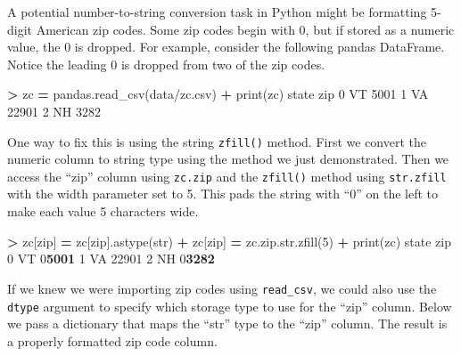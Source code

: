 \documentclass[
]{book}
\newenvironment{Shaded}{\begin{snugshade}}{\end{snugshade}}
\newcommand{\BuiltInTok}[1]{#1}
\newcommand{\DecValTok}[1]{\textcolor[rgb]{0.00,0.00,0.81}{#1}}
\newcommand{\ErrorTok}[1]{\textcolor[rgb]{0.64,0.00,0.00}{\textbf{#1}}}
\newcommand{\NormalTok}[1]{#1}
\newcommand{\OperatorTok}[1]{\textcolor[rgb]{0.81,0.36,0.00}{\textbf{#1}}}
\newcommand{\StringTok}[1]{\textcolor[rgb]{0.31,0.60,0.02}{#1}}
\begin{document}
A potential number-to-string conversion task in Python might be formatting 5-digit American zip codes. Some zip codes begin with 0, but if stored as a numeric value, the 0 is dropped. For example, consider the following pandas DataFrame. Notice the leading 0 is dropped from two of the zip codes.

\begin{Shaded}
\begin{Highlighting}[]
\OperatorTok{\textgreater{}}\NormalTok{ zc }\OperatorTok{=}\NormalTok{ pandas.read\_csv(}\StringTok{\textquotesingle{}data/zc.csv\textquotesingle{}}\NormalTok{)}
\OperatorTok{+} \BuiltInTok{print}\NormalTok{(zc)}
\NormalTok{  state    }\BuiltInTok{zip}
\DecValTok{0}\NormalTok{    VT   }\DecValTok{5001}
\DecValTok{1}\NormalTok{    VA  }\DecValTok{22901}
\DecValTok{2}\NormalTok{    NH   }\DecValTok{3282}
\end{Highlighting}
\end{Shaded}

One way to fix this is using the string \texttt{zfill()} method. First we convert the numeric column to string type using the method we just demonstrated. Then we access the ``zip'' column using \texttt{zc.zip} and the \texttt{zfill()} method using \texttt{str.zfill} with the width parameter set to 5. This pads the string with ``0'' on the left to make each value 5 characters wide.

\begin{Shaded}
\begin{Highlighting}[]
\OperatorTok{\textgreater{}}\NormalTok{ zc[}\StringTok{\textquotesingle{}zip\textquotesingle{}}\NormalTok{] }\OperatorTok{=}\NormalTok{ zc[}\StringTok{\textquotesingle{}zip\textquotesingle{}}\NormalTok{].astype(}\BuiltInTok{str}\NormalTok{)}
\OperatorTok{+}\NormalTok{ zc[}\StringTok{\textquotesingle{}zip\textquotesingle{}}\NormalTok{] }\OperatorTok{=}\NormalTok{ zc.}\BuiltInTok{zip}\NormalTok{.}\BuiltInTok{str}\NormalTok{.zfill(}\DecValTok{5}\NormalTok{)}
\OperatorTok{+} \BuiltInTok{print}\NormalTok{(zc)}
\NormalTok{  state    }\BuiltInTok{zip}
\DecValTok{0}\NormalTok{    VT  }\DecValTok{0}\ErrorTok{5001}
\DecValTok{1}\NormalTok{    VA  }\DecValTok{22901}
\DecValTok{2}\NormalTok{    NH  }\DecValTok{0}\ErrorTok{3282}
\end{Highlighting}
\end{Shaded}

If we knew we were importing zip codes using \texttt{read\_csv}, we could also use the \texttt{dtype} argument to specify which storage type to use for the ``zip'' column. Below we pass a dictionary that maps the ``str'' type to the ``zip'' column. The result is a properly formatted zip code column.
\end{document}
